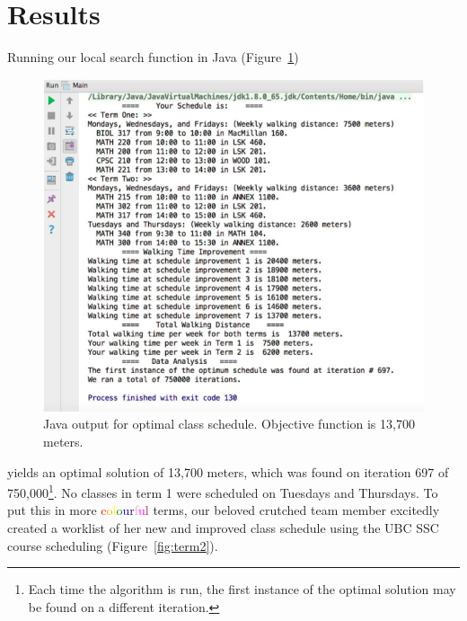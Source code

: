 \documentclass[11pt, oneside]{article}   	%
\begin{document}
\cleardoublepage
\section{Results}

Running our local search function in Java (Figure~\ref{fig:optimal})

\begin{figure}[h]                                   
\begin{center}
\includegraphics[width=.86\textwidth]{optimal.jpg}
\caption{\label{fig:optimal}Java output for optimal class schedule. Objective function is 13,700 meters.}
\end{center}
\end{figure}

yields an optimal solution of 13,700 meters, which was found on iteration 697 of 750,000\footnote{Each time the algorithm is run, the first instance of the optimal solution may be found on a different iteration.}. No classes in term 1 were scheduled on Tuesdays and Thursdays. To put this in more \textcolor{red}{c}\textcolor{Orange}{o}\textcolor{yellow}{l}\textcolor{green}{o}\textcolor{blue}{u}\textcolor{ProcessBlue}{r}\textcolor{Plum}{f}\textcolor{magenta}{u}\textcolor{Brown}{l} terms, our beloved crutched team member excitedly created a worklist of her new and improved class schedule using the UBC SSC course scheduling (Figure~\ref{fig:term2}).
\end{document}
